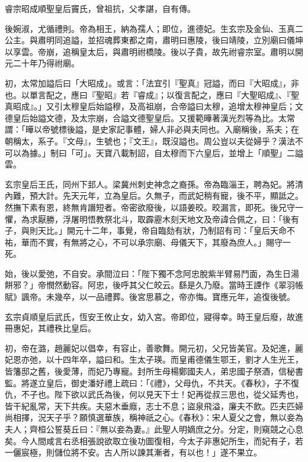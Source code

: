 \begin{pinyinscope}
 睿宗昭成順聖皇后竇氏，曾祖抗，父孝諶，自有傳。



 後婉淑，尤循禮則。帝為相王，納為孺人；即位，進德妃。生玄宗及金仙、玉真二公主。與肅明同追謚，並招魂葬東都之南，肅明曰惠陵，後曰靖陵，立別廟曰儀坤以享雲。帝崩，追稱皇太后，與肅明祔橋陵。後以子貴，故先祔睿宗室。肅明以開元二十年乃得祔廟。



 初，太常加謚后曰「大昭成」。或言：「法宜引『聖真』冠謚，而曰『大昭成』，非也。以單言配之，應曰『聖昭』若『睿成』；以復言配之，應曰『大聖昭成』、『聖真昭成』。」又引太穆皇后始謚穆，及高祖崩，合帝謚曰太穆，追增太穆神皇后；文德皇后始謚文德，及太宗崩，合謚文德聖皇后。又援範曄著漢光烈等為比。太常謂：「曄以帝號標後謚，是史家記事體，婦人非必與夫同也。入廟稱後，系夫；在朝稱太，系子。『文母』，生號也；『文王』，既沒謚也。周公豈以夫從婦乎？漢法不可以為據。」制曰「可」。天寶八載制詔，自太穆而下六皇后，並增上「順聖」二謚雲。



 玄宗皇后王氏，同州下邽人。梁冀州刺史神念之裔孫。帝為臨淄王，聘為妃。將清內難，預大計。先天元年，立為皇后。久無子，而武妃稍有寵，後不平，顯詆之。然撫下素有恩，終無肯譖短者。帝密欲廢後，以語姜晈。晈漏言，即死。後兄守一懼，為求厭勝，浮屠明悟教祭北斗，取霹靂木刻天地文及帝諱合佩之，曰：「後有子，與則天比。」開元十二年，事覺，帝自臨劾有狀，乃制詔有司：「皇后天命不祐，華而不實，有無將之心，不可以承宗廟、母儀天下，其廢為庶人。」賜守一死。



 始，後以愛弛，不自安。承間泣曰：「陛下獨不念阿忠脫紫半臂易鬥面，為生日湯餅邪？」帝憫然動容。阿忠，後呼其父仁皎云。繇是久乃廢。當時王諲作《翠羽帳賦》諷帝。未幾卒，以一品禮葬。後宮思慕之，帝亦悔。寶應元年，追復後號。



 玄宗貞順皇后武氏，恆安王攸止女，幼入宮。帝即位，寢得幸。時王皇后廢，故進冊惠妃，其禮秩比皇后。



 初，帝在潞，趙麗妃以倡幸，有容止，善歌舞。開元初，父兄皆美官。及妃進，麗妃恩亦弛，以十四年卒，謚曰和。生太子瑛。而皇甫德儀生鄂王，劉才人生光王，皆籓邸之舊，後愛薄，而妃乃專寵。封所生母楊鄭國夫人，弟忠國子祭酒，信秘書監。將遂立皇后，御史潘好禮上疏曰：「《禮》，父母仇，不共天。《春秋》，子不復仇，不子也。陛下欲以武氏為後，何以見天下士！妃再從叔三思也，從父延秀也，皆干紀亂常，天下共疾。夫惡木垂廕，志士不息；盜泉飛溢，廉夫不飲。匹夫匹婦尚相擇，況天子乎？願慎選華族，稱神祇之心。《春秋》：宋人夏父之會，無以妾為夫人；齊桓公誓葵丘曰：『無以妾為妻。』此聖人明嫡庶之分。分定，則窺競之心息矣。今人間咸言右丞相張說欲取立後功圖復相，今太子非惠妃所生，而妃有子，若一儷宸極，則儲位將不安。古人所以諫其漸者，有以也！」遂不果立。




\end{pinyinscope}

